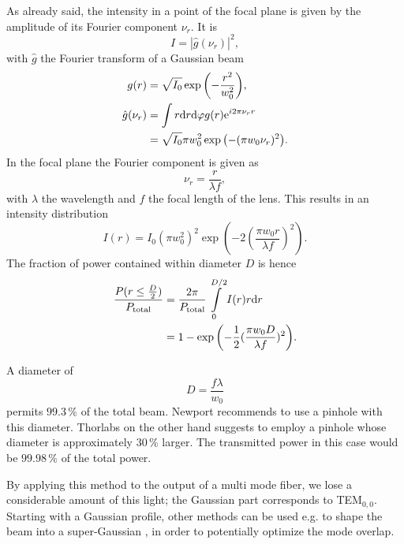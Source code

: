 As already said,
the intensity in a point of the focal plane
is given by the amplitude
of its Fourier component $\nu_r$.
It is \cite{QE}
\begin{equation}
I = \left| \hat{g}(\nu_r) \right|^2,
\end{equation}
with $\hat{g}$ the Fourier transform
of a Gaussian beam
\begin{align}
g(r) &= \sqrt{I_0} \exp{\left(-\frac{r^2}{w_0^2}\right)}, \\
\hat{g}(\nu_r) &= \int r\mathrm{d} r\mathrm{d} \varphi g(r) \mathrm{e}^{i2\pi\nu_r r}\\
 &= \sqrt{I_0}\pi w_0^2 \exp{\left(-(\pi w_0 \nu_r)^2\right)}.
\end{align}
In the focal plane the Fourier component is given as
\begin{equation}
\nu_r = \frac{r}{\lambda f},
\end{equation}
with $\lambda$ the wavelength
and $f$ the focal length of the lens.
This results in an intensity distribution
\begin{equation}
I(r) = I_0(\pi w_0^2)^2 \exp{\left( -2(\frac{\pi w_0 r}{\lambda f})^2 \right)}.
\end{equation}
The fraction of power contained within diameter $D$ is hence \cite{Newport}
\begin{align}
\frac{P(r\leq \frac{D}{2})}{P_\mathrm{total}}
  &= \frac{2\pi}{P_\mathrm{total}} \int\limits_0^{D/2} I(r)r\mathrm{d} r \\
  &= 1- \exp{\left(-\frac{1}{2}(\frac{\pi w_0 D}{\lambda f})^2\right)}.
\label{eq:power}
\end{align}

A diameter of
\begin{equation}
D=\frac{f\lambda}{w_0}
\label{eq:diameter}
\end{equation}
permits $99.3\,\%$ of the total beam.
Newport \cite{Newport} recommends to use a pinhole
with this diameter.
Thorlabs on the other hand \cite{Thorlabs}
suggests to employ a pinhole
whose diameter is approximately $30\,\%$ larger.
The transmitted power in this case
would be $99.98\,\%$ of the total power.

By applying this method
to the output of a multi mode fiber,
we lose a considerable amount of this light;
the Gaussian part corresponds to TEM$_{0,0}$.
Starting with a Gaussian profile,
other methods can be used e.g.
to shape the beam into a super-Gaussian
\cite{Mansell2000},
in order to potentially
optimize the mode overlap.
